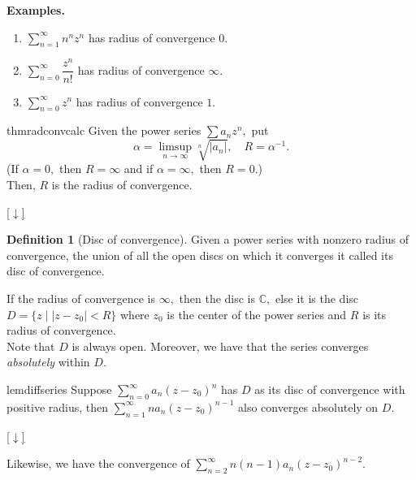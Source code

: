 \documentclass[12pt,oneside]{book}
\theoremstyle{definition}
\numberwithin{thm}{chapter}
\newtheorem{defn}[thm]{Definition}
\newcommand{\downsym}{[$\downarrow$]}
\begin{document}
\textbf{Examples.}
\begin{enumerate}
	\item $\displaystyle\sum_{n=1}^{\infty}n^nz^n$ has radius of convergence $0.$
	\item $\displaystyle\sum_{n=0}^{\infty}\dfrac{z^n}{n!}$ has radius of convergence $\infty.$
	\item $\displaystyle\sum_{n=0}^{\infty}z^n$ has radius of convergence $1.$
\end{enumerate}

\begin{restatable}{thm}{radconvcalc}
\label{thm:radconvcalc}
	Given the power series $\sum a_nz^n,$ put
	\begin{equation*} 
		\alpha = \limsup_{n\to\infty}\sqrt[n]{|a_n|}, \quad R = \alpha^{-1}.
	\end{equation*}
	(If $\alpha = 0,$ then $R = \infty$ and if $\alpha = \infty,$ then $R = 0.$)\\
	Then, $R$ is the radius of convergence.
\end{restatable}
\begin{flushright}\hyperref[thm:radconvcalc2]{\downsym}\end{flushright}

\begin{defn}[Disc of convergence]
	Given a power series with nonzero radius of convergence, the union of all the open discs on which it converges it called its disc of convergence.
\end{defn}
If the radius of convergence is $\infty,$ then the disc is $\mathbb{C},$ else it is the disc $D = \{z \mid |z - z_0| < R\}$ where $z_0$ is the center of the power series and $R$ is its radius of convergence.\\
Note that $D$ is always open. Moreover, we have that the series converges \emph{absolutely} within $D.$

\begin{restatable}[]{lem}{diffseries}
\label{lem:diffseries}
	Suppose $\displaystyle\sum_{n=0}^{\infty}a_n(z - z_0)^n$ has $D$ as its disc of convergence with positive radius, then $\displaystyle\sum_{n=1}^{\infty}na_n(z - z_0)^{n-1}$ also converges absolutely on $D.$
\end{restatable}
\begin{flushright}\hyperref[lem:diffseries2]{\downsym}\end{flushright}
Likewise, we have the convergence of $\displaystyle\sum_{n=2}^{\infty}n(n-1)a_n(z - z_0)^{n-2}.$
\end{document}
